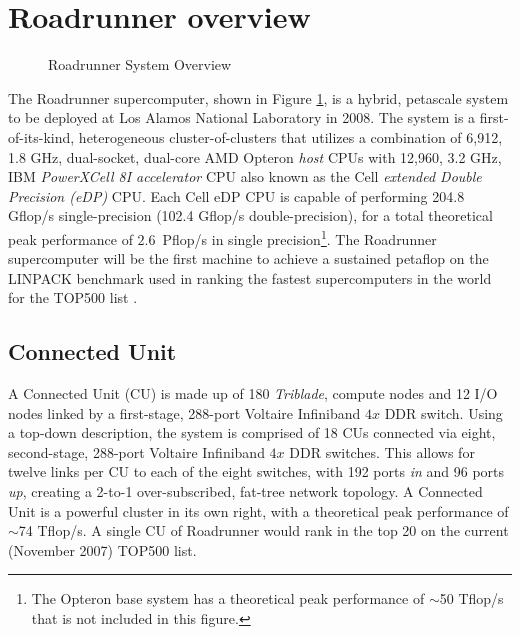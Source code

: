 \documentclass[10pt]{article}
\begin{document}
\section{Roadrunner overview}

\begin{figure}
    \begin{center}
    \caption{Roadrunner System Overview}
    \label{fig:system}
    \end{center}
\end{figure}

The Roadrunner supercomputer, shown in Figure \ref{fig:system}, is a
hybrid, petascale system to be deployed at Los Alamos National
Laboratory in 2008.  The system is a first-of-its-kind, heterogeneous
cluster-of-clusters that utilizes a combination of 6,912, 1.8 GHz,
dual-socket, dual-core AMD Opteron \emph{host} CPUs with 12,960, 3.2
GHz, IBM \emph{PowerXCell 8I accelerator} CPU also known as the Cell
\emph{extended Double Precision (eDP)} CPU.  Each Cell eDP CPU
is capable of performing 204.8 Gflop/s single-precision (102.4 Gflop/s 
double-precision), for a total theoretical peak performance of
$2.6$~Pflop/s in single precision\footnote{The Opteron base system has 
a theoretical peak performance of $\sim$50 Tflop/s that is not included 
in this figure.}.  The Roadrunner supercomputer will be the first machine 
to achieve a sustained petaflop on the LINPACK benchmark used in ranking
the fastest supercomputers in the world for the TOP500 list
\cite{top500}.

\subsection{Connected Unit}

A Connected Unit (CU) is made up of 180 \emph{Triblade}, compute
nodes and 12 I/O nodes linked by a first-stage, 288-port Voltaire
Infiniband $4x$ DDR switch.  Using a top-down description, the
system is comprised of 18 CUs connected via eight, second-stage,
288-port Voltaire Infiniband $4x$ DDR switches.  This allows for
twelve links per CU to each of the eight switches, with 192 ports
\emph{in} and 96 ports \emph{up}, creating a 2-to-1 over-subscribed,
fat-tree network topology.  A Connected Unit is a powerful cluster in
its own right, with a theoretical peak performance of $\sim$74
Tflop/s.  A single CU of Roadrunner would rank in the top 20 on the
current (November 2007) TOP500 list.
\end{document}
